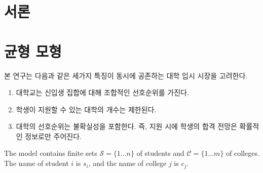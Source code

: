 \documentclass[12pt]{article} %
\author{Max Kapur}
\date{\today}                %
\newif\ifEN
\theoremstyle{definition}
\theoremstyle{definition}
\begin{document}
\maketitle
\pagebreak

\tableofcontents
\pagebreak

\ifEN \section{Introduction}  \else \section{서론} \fi

\ifEN \section{Equilibrium model}  \else \section{균형 모형} \fi
\ifEN {
This study considers the efficiency of a college admissions market in which the following three features coincide:
\begin{enumerate}
\item \label{feat-combipref} Colleges have \emph{combinatorial} preferences over the composition of their entering class. 
\item \label{feat-uncertainty}There is \emph{uncertainty} in colleges’ preferences; that is, students have only probabilistic information about their admissions prospects at the time of application.
\item \label{feat-constrainedapp} Students are \emph{constrained} in the number of schools to which they can apply.  
\end{enumerate}
} \else {
본 연구는 다음과 같은 세가지 특징이 동시에 공존하는 대학 입시 시장을 고려한다.
\begin{enumerate}
\item 대학교는 신입생 집합에 대해 조합적인 선호순위를 가진다.
\item 학생이 지원할 수 있는 대학의 개수는 제한된다.
\item 대학의 선호순위는 불확실성을 포함한다. 즉, 지원 시에 학생의 합격 전망은 확률적인 정보로만 주어진다.
\end{enumerate}
} \fi
The model contains finite sets $\mathcal{S} = \{1 \dots n\}$ of students and $\mathcal{C} = \{1 \dots m\}$ of colleges. The name of student $i$ is $s_i$, and the name of college $j$ is $c_j$. 
\end{document}
